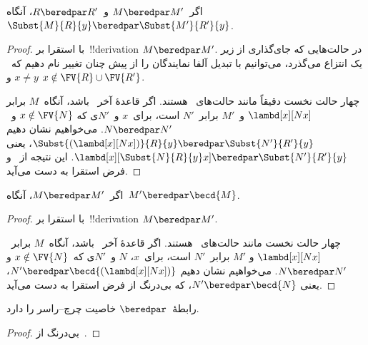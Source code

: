 \documentclass[../../../include/open-logic-section]{subfiles}
\begin{document}
\begin{lem}
  اگر~$M \beredpar M'$ و~$R \beredpar R'$، آنگاه
  $\Subst{M}{R}{y} \beredpar \Subst{M'}{R'}{y}$.
\end{lem}

\begin{proof}
  با استقرا بر~!!{derivation}ِ $M \beredpar M'$. در حالت‌هایی که
  جای‌گذاری از زیر یک انتزاع می‌گذرد، می‌توانیم با تبدیل آلفا نمایندگان
  را از پیش چنان تغییر نام دهیم که~$x \neq y$ و
  $x \notin \FV{R} \cup \FV{R'}$.

  چهار حالت نخست دقیقاً مانند حالت‌های~ هستند.
  اگر قاعدهٔ آخر~ باشد، آنگاه~$M$ برابر
  $\lambd[x][Nx]$ و~$M'$ برابر~$N'$ است، برای~$x$ و~$N'$ی که
  $x \notin \FV{N}$ و~$N \beredpar N'$. می‌خواهیم نشان دهیم
  $\Subst{(\lambd[x][Nx])}{R}{y} \beredpar \Subst{N'}{R'}{y}$، یعنی
  $\lambd[x][\Subst{N}{R}{y} x] \beredpar \Subst{N'}{R'}{y}$. این
  نتیجه از~ و فرض استقرا
  به دست می‌آید.
\end{proof}

\begin{lem}
  اگر~$M \beredpar M'$، آنگاه~$M' \beredpar \becd{M}$.
\end{lem}

\begin{proof}
  با استقرا بر~!!{derivation}ِ $M \beredpar M'$.

  چهار حالت نخست مانند حالت‌های~ هستند. اگر قاعدهٔ
  آخر~ باشد، آنگاه~$M$ برابر~$\lambd[x][Nx]$ و
  $M'$ برابر~$N'$ است، برای~$x$، $N$ و~$N'$ی که~$x \notin \FV{N}$ و
  $N \beredpar N'$. می‌خواهیم نشان دهیم
  $N' \beredpar \becd{(\lambd[x][Nx])}$، یعنی
  $N' \beredpar \becd{N}$، که بی‌درنگ از فرض استقرا به دست می‌آید.
\end{proof}

\begin{thm}
  رابطهٔ~$\beredpar$ خاصیت چرچ--راسر را دارد.
\end{thm}

\begin{proof}
  بی‌درنگ از~.
\end{proof}
\end{document}
